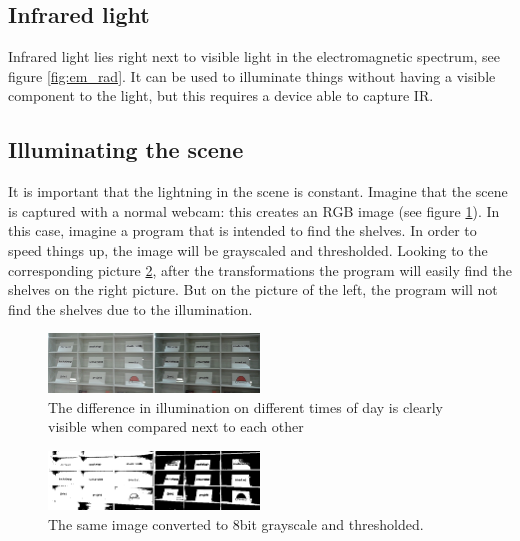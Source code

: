 


\subsection{Infrared light}

Infrared light lies right next to visible light in the electromagnetic spectrum, see figure \ref{fig:em_rad}. It can be used to illuminate things without having a visible component to the light, but this requires a device able to capture IR. %




\subsection{Illuminating the scene}

It is important that the lightning in the scene is constant. Imagine that the scene is captured with a normal webcam: this creates an RGB image (see figure \ref{fig:scene_light}). In this case, imagine a program that is intended to find the shelves. In order to speed things up, the image will be grayscaled and thresholded. Looking to the corresponding picture \ref{fig:scene_thresholded}, after the transformations the program will easily find the shelves on the right picture. But on the picture of the left, the program will not find the shelves due to the illumination.

\begin{figure}[htbp] 
\centering 
\includegraphics[width=0.5\textwidth]{Pictures/HjoerringLibrary/scene_lighting.png} 
\caption{The difference in illumination on different times of day is clearly visible when compared next to each other} 
\label{fig:scene_light} 
\end{figure}

\begin{figure}[htbp] 
\centering 
\includegraphics[width=0.5\textwidth]{Pictures/HjoerringLibrary/scene_lighting_thresholded.png} 
\caption{The same image converted to 8bit grayscale and thresholded.} 
\label{fig:scene_thresholded} 
\end{figure}

